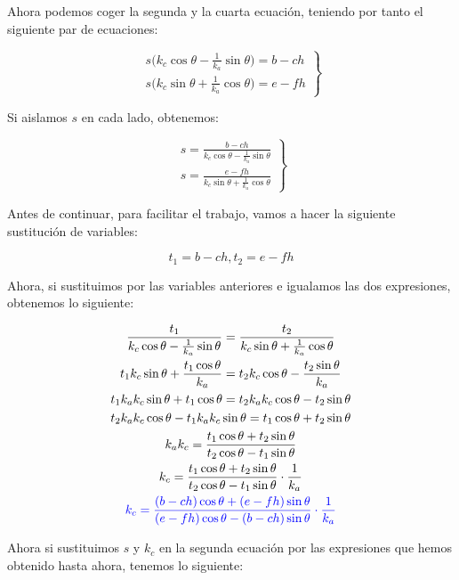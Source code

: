 \documentclass[11pt,a4paper]{article}
\begin{document}
Ahora podemos coger la segunda y la cuarta ecuación,
teniendo por tanto el siguiente par de ecuaciones:

\begin{equation}
\left.\begin{matrix}
 s\Big(k_c\cos\theta - \frac{1}{k_a}\sin\theta\Big) = b -ch \\
 s\Big(k_c\sin\theta + \frac{1}{k_a}\cos\theta\Big) = e-fh
\end{matrix}\right\}
\end{equation}

Si aislamos $s$ en cada lado, obtenemos:

\begin{equation}
\left.\begin{matrix}
 s = \frac{b-ch}{k_c\cos\theta - \frac{1}{k_a}\sin\theta} \\
 s = \frac{e-fh}{k_c\sin\theta + \frac{1}{k_a}\cos\theta}
\end{matrix}\right\}
\end{equation}

Antes de continuar, para facilitar el trabajo,
vamos a hacer la siguiente sustitución de variables:

$$
t_1 = b-ch, t_2 = e-fh
$$

Ahora, si sustituimos por las variables anteriores e igualamos
las dos expresiones, obtenemos lo siguiente:

\begin{gather*}
\frac{t_1}{k_c\cos\theta - \frac{1}{k_a}\sin\theta} = \frac{t_2}{k_c\sin\theta + \frac{1}{k_a}\cos\theta}\\
t_1k_c\sin\theta + \frac{t_1\cos\theta}{k_a} = t_2k_c\cos\theta - \frac{t_2\sin\theta}{k_a}\\
t_1k_ak_c\sin\theta + t_1\cos\theta = t_2k_ak_c\cos\theta - t_2\sin\theta\\
t_2k_ak_c\cos\theta - t_1k_ak_c\sin\theta = t_1\cos\theta + t_2\sin\theta \\
k_ak_c = \frac{t_1\cos\theta + t_2\sin\theta}{t_2\cos\theta - t_1\sin\theta}\\
k_c = \frac{t_1\cos\theta + t_2\sin\theta}{t_2\cos\theta - t_1\sin\theta} \cdot \frac{1}{k_a}\\
\textcolor{blue}{k_c = \frac{(b-ch)\cos\theta + (e-fh)\sin\theta}{(e-fh)\cos\theta - (b-ch)\sin\theta} \cdot \frac{1}{k_a}}
\end{gather*}

Ahora si sustituimos $s$ y $k_c$ en la segunda ecuación por las
expresiones que hemos obtenido hasta ahora, tenemos lo siguiente:
\end{document}
